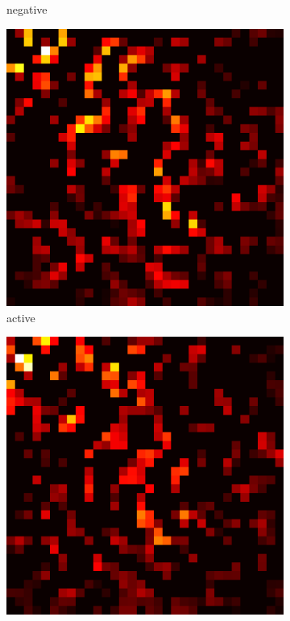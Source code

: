 \documentclass[preprint,12pt]{elsarticle}
\begin{document}
\begin{figure}
\begin{subfigure}{0.14\textwidth}
        \caption{negative}
    \end{subfigure}
    \hfill
    \begin{subfigure}{0.14\textwidth}
        \centering
        \includegraphics[width=\linewidth]{../visualizations/examples/cifar10/resnet18/active_saliency_map/2.png}
        \caption{active}
    \end{subfigure}
    \hfill
    \begin{subfigure}{0.14\textwidth}
        \centering
        \includegraphics[width=\linewidth]{../visualizations/examples/cifar10/resnet18/inactive_saliency_map/2.png}

\end{subfigure}
\end{figure}
\end{document}
